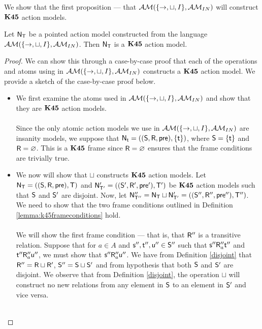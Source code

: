 We show that the first proposition --- that $\mathcal{AM}(\{\to,\sqcup,I\}, \mathcal{AM}_{IN})$ will construct
$\bf K45$ action models.

\begin{lemma} \label{lemma:onlyK45Models}
	Let $\mathrm{\mathsf{N}}_\mathrm{\mathsf{T}}$ be a pointed action model constructed from the language $\mathcal{AM}(\{\to,\sqcup,I\}, \mathcal{AM}_{IN})$.
	Then $\mathrm{\mathsf{N}}_\mathrm{\mathsf{T}}$ is a $\bf K45$ action model.
\end{lemma}
\begin{proof}
	We can show this through a case-by-case proof that each of the operations and atoms using in
	$\mathcal{AM}(\{\to,\sqcup,I\}, \mathcal{AM}_{IN})$ constructs a $\bf K45$ action model.
	We provide a sketch of the case-by-case proof below.
	\begin{itemize}
		\item We first examine the atoms used in $\mathcal{AM}(\{\to,\sqcup,I\}, \mathcal{AM}_{IN})$ and show that
    they are $\bf K45$ action models.\\
	\\
	Since the only atomic action models we use in $\mathcal{AM}(\{\to,\sqcup,I\}, \mathcal{AM}_{IN})$ are insanity models, we suppose
	that $\mathrm{\mathsf{N}}_{\mathrm{\mathsf{t}}} = ((\mathrm{\mathsf{S}},\mathrm{\mathsf{R}},\mathrm{\mathsf{pre}}),\{\mathrm{\mathsf{t}}\})$, where $\mathrm{\mathsf{S}} = \{\mathrm{\mathsf{t}}\}$ and $\mathrm{\mathsf{R}} =
	\varnothing$.
	This is a $\bf K45$ frame since $\mathrm{\mathsf{R}} = \varnothing$ ensures that the frame conditions
	are trivially true.
		\item We now will show that $\sqcup$ constructs $\bf K45$ action models.
	Let $\mathrm{\mathsf{N}}_\mathrm{\mathsf{T}} = ((\mathrm{\mathsf{S}},\mathrm{\mathsf{R}},\mathrm{\mathsf{pre}}),\mathrm{\mathsf{T}})$ and $\mathrm{\mathsf{N}}'_{\mathrm{\mathsf{T}}'} = ((\mathrm{\mathsf{S}}',\mathrm{\mathsf{R}}',\mathrm{\mathsf{pre}}'),\mathrm{\mathsf{T}}')$ be
	$\bf K45$ action models such that $\mathrm{\mathsf{S}}$ and $\mathrm{\mathsf{S}}'$ are disjoint.
	Now, let $\mathrm{\mathsf{N}}''_{\mathrm{\mathsf{T}}''} = \mathrm{\mathsf{N}}_\mathrm{\mathsf{T}} \sqcup \mathrm{\mathsf{N}}'_{\mathrm{\mathsf{T}}'} = ((\mathrm{\mathsf{S}}'',\mathrm{\mathsf{R}}'',\mathrm{\mathsf{pre}}''),\mathrm{\mathsf{T}}'')$.
	We need to show that the two frame conditions outlined in Definition \ref{lemma:k45frameconditions}
	hold.\\
	\\
	We will show the first frame condition --- that is, that $\mathrm{\mathsf{R}}''$ is a transitive relation.
	Suppose that for $a \in A$ and $\mathrm{\mathsf{s}}'', \mathrm{\mathsf{t}}'', \mathrm{\mathsf{u}}'' \in \mathrm{\mathsf{S}}''$ such that $\mathrm{\mathsf{s}}'' \mathrm{\mathsf{R}}''_a
	\mathrm{\mathsf{t}}''$ and $\mathrm{\mathsf{t}}'' \mathrm{\mathsf{R}}''_a \mathrm{\mathsf{u}}''$, we must show that $\mathrm{\mathsf{s}}'' \mathrm{\mathsf{R}}''_a \mathrm{\mathsf{u}}''$.
	We have from Definition \ref{disjoint} that $\mathrm{\mathsf{R}}'' = \mathrm{\mathsf{R}} \sqcup \mathrm{\mathsf{R}}'$, $\mathrm{\mathsf{S}}'' = \mathrm{\mathsf{S}} \sqcup
	\mathrm{\mathsf{S}}'$ and from hypothesis that both $\mathrm{\mathsf{S}}$ and $\mathrm{\mathsf{S}}'$ are disjoint.
	We observe that from Definition \ref{disjoint}, the operation $\sqcup$ will construct no new
	relations from any element in $\mathrm{\mathsf{S}}$ to an element in $\mathrm{\mathsf{S}}'$ and vice versa.\\
	\\

\end{itemize}
\end{proof}
